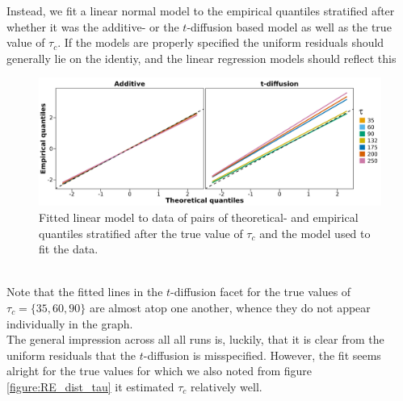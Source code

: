 Instead, we fit a linear normal model to the empirical quantiles stratified after whether it was the additive- or the $t$-diffusion based model as well as the true value of $\tau_c$. If the models are properly specified the uniform residuals should generally lie on the identiy, and the linear regression models should reflect this
\begin{figure}[h!]
    \begin{center}
        \includegraphics[scale = .075]{figures/quantiles_plot_tau.jpeg}
        \caption{Fitted linear model to data of pairs of theoretical- and empirical quantiles stratified after the true value of $\tau_c$ and the model used to fit the data.}
        \label{figure:QQ_plot_tau}
    \end{center}
\end{figure}\\
Note that the fitted lines in the $t$-diffusion facet for the true values of $\tau_c = \{35, 60, 90\}$ are almost atop one another, whence they do not appear individually in the graph. \\
The general impression across all all runs is, luckily, that it is clear from the uniform residuals that the $t$-diffusion is misspecified. However, the fit seems alright for the true values for which we also noted from figure \ref{figure:RE_dist_tau} it estimated $\tau_c$ relatively well. 